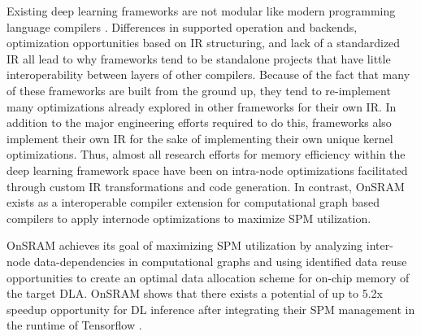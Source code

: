 Existing deep learning frameworks are not modular like modern programming
language compilers \cite{tensorflow} \cite{TVM} \cite{nGraph}. Differences in
supported operation and backends, optimization opportunities based on IR
structuring, and lack of a standardized IR \cite{nGraph}\cite{DLVM} all lead to
why frameworks tend to be standalone projects that have little interoperability
between layers of other compilers. Because of the fact that many of these
frameworks are built from the ground up, they tend to re-implement many
optimizations already explored in other frameworks for their own IR. In
addition to the major engineering efforts required to do this, frameworks also
implement their own IR for the sake of implementing their own unique kernel
optimizations. Thus, almost all research efforts for memory efficiency within
the deep learning framework space have been on intra-node optimizations
facilitated through custom IR transformations and code generation. In contrast,
OnSRAM exists as a interoperable compiler extension for computational graph
based compilers to apply internode optimizations to maximize SPM utilization.



OnSRAM achieves its goal of maximizing SPM utilization by analyzing inter-node
data-dependencies in computational graphs and using identified data reuse
opportunities to create an optimal data allocation scheme for on-chip memory of
the target DLA. OnSRAM shows that there exists a potential of up to 5.2x
speedup opportunity for DL inference after integrating their SPM management in
the runtime of Tensorflow \cite{onsram}.



